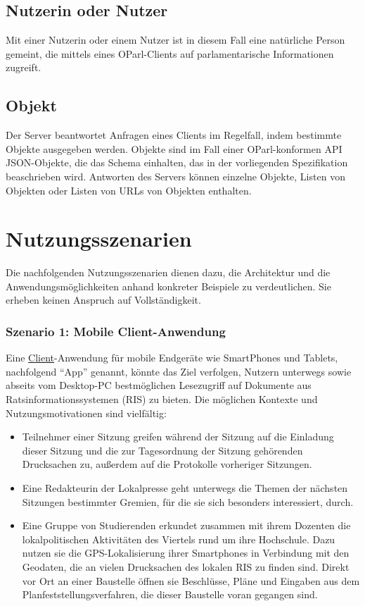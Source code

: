 \documentclass[,a4paper]{article}
\begin{document}
\subsection{Nutzerin oder Nutzer}

Mit einer Nutzerin oder einem Nutzer ist in diesem Fall eine natürliche
Person gemeint, die mittels eines OParl-Clients auf parlamentarische
Informationen zugreift.

\subsection{Objekt}

Der Server beantwortet Anfragen eines Clients im Regelfall, indem
bestimmte Objekte ausgegeben werden. Objekte sind im Fall einer
OParl-konformen API JSON-Objekte, die das Schema einhalten, das in der
vorliegenden Spezifikation beaschrieben wird. Antworten des Servers
können einzelne Objekte, Listen von Objekten oder Listen von URLs von
Objekten enthalten.

\section{Nutzungsszenarien}

Die nachfolgenden Nutzungsszenarien dienen dazu, die Architektur und die
Anwendungsmöglichkeiten anhand konkreter Beispiele zu verdeutlichen. Sie
erheben keinen Anspruch auf Vollständigkeit.

\subsubsection{Szenario 1: Mobile Client-Anwendung}

Eine \hyperref[client]{Client}-Anwendung für mobile Endgeräte wie
SmartPhones und Tablets, nachfolgend ``App'' genannt, könnte das Ziel
verfolgen, Nutzern unterwegs sowie abseits vom Desktop-PC bestmöglichen
Lesezugriff auf Dokumente aus Ratsinformationssystemen (RIS) zu bieten.
Die möglichen Kontexte und Nutzungsmotivationen sind vielfältig:

\begin{itemize}
\item
  Teilnehmer einer Sitzung greifen während der Sitzung auf die Einladung
  dieser Sitzung und die zur Tagesordnung der Sitzung gehörenden
  Drucksachen zu, außerdem auf die Protokolle vorheriger Sitzungen.
\item
  Eine Redakteurin der Lokalpresse geht unterwegs die Themen der
  nächsten Sitzungen bestimmter Gremien, für die sie sich besonders
  interessiert, durch.
\item
  Eine Gruppe von Studierenden erkundet zusammen mit ihrem Dozenten die
  lokalpolitischen Aktivitäten des Viertels rund um ihre Hochschule.
  Dazu nutzen sie die GPS-Lokalisierung ihrer Smartphones in Verbindung
  mit den Geodaten, die an vielen Drucksachen des lokalen RIS zu finden
  sind. Direkt vor Ort an einer Baustelle öffnen sie Beschlüsse, Pläne
  und Eingaben aus dem Planfeststellungsverfahren, die dieser Baustelle
  voran gegangen sind.
\end{itemize}
\end{document}
